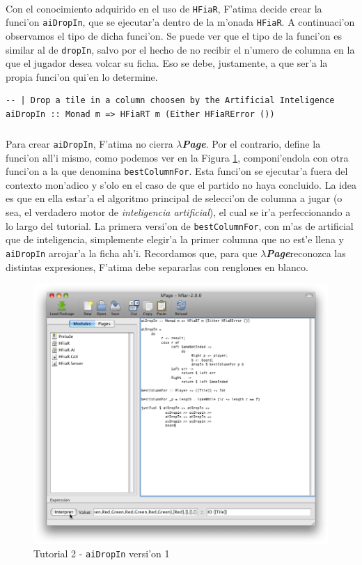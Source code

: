 \documentclass[a4paper]{article}
\newcommand{\hpage}{\textbf{\textsl{$\lambda$Page}}}
\begin{document}
\paragraph{}Con el conocimiento adquirido en el uso de \texttt{HFiaR}, F'atima decide crear la funci'on \texttt{aiDropIn}, que se ejecutar'a dentro de la m'onada \texttt{HFiaR}.  A continuaci'on observamos el tipo de dicha funci'on.  Se puede ver que el tipo de la funci'on es similar al de \texttt{dropIn}, salvo por el hecho de no recibir el n'umero de columna en la que el jugador desea volcar su ficha.  Eso se debe, justamente, a que ser'a la propia funci'on qui'en lo determine.
\begin{center}\begin{lstlisting}
-- | Drop a tile in a column choosen by the Artificial Inteligence
aiDropIn :: Monad m => HFiaRT m (Either HFiaRError ())
\end{lstlisting}\end{center}
\subparagraph{}Para crear \texttt{aiDropIn}, F'atima no cierra \hpage.  Por el contrario, define la funci'on all'i mismo, como podemos ver en la Figura \ref{tut207}, componi'endola con otra funci'on a la que denomina \texttt{bestColumnFor}.  Esta funci'on se ejecutar'a fuera del contexto mon'adico y s'olo en el caso de que el partido no haya concluido.  La idea es que en ella estar'a el algoritmo principal de selecci'on de columna a jugar (o sea, el verdadero motor de \textsl{inteligencia artificial}), el cual se ir'a perfeccionando a lo largo del tutorial.  La primera versi'on de \texttt{bestColumnFor}, con m'as de artificial que de inteligencia, simplemente elegir'a la primer columna que no est'e llena y \texttt{aiDropIn} arrojar'a la ficha ah'i.  Recordamos que, para que \hpage reconozca las distintas expresiones, F'atima debe separarlas con renglones en blanco.
\begin{figure}[hp]
	\begin{center}
        	\includegraphics[width=.75\textwidth]{pictures/tut2/06}
		\caption{Tutorial 2 - \texttt{aiDropIn} versi'on 1}
		\label{tut207}
	\end{center}
\end{figure}
\end{document}
